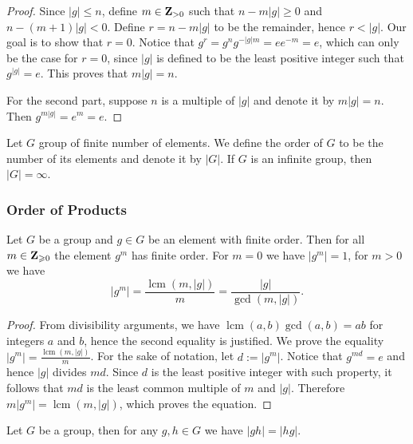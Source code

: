 \begin{proof}
  Since \(|g| \leq n\), define \(m \in \mathbf{Z}_{> 0}\) such that \(n - m |g|
  \geq 0\) and \(n - (m + 1) |g| < 0\). Define \(r = n - m |g|\) to be the
  remainder, hence \(r < |g|\). Our goal is to show that \(r = 0\). Notice that
  \(g^r = g^n g^{-|g| m} = e e^{-m} = e\), which can only be the case for \(r =
  0\), since \(|g|\) is defined to be the least positive integer such that
  \(g^{|g|} = e\). This proves that \(m |g| = n\).

  For the second part, suppose \(n\) is a multiple of \(|g|\) and denote it by
  \(m|g| = n\). Then \(g^{m |g|} = e^m = e\).
\end{proof}

\begin{definition}
  Let \(G\) group of finite number of elements. We define the order of \(G\) to
  be the number of its elements and denote it by \(|G|\). If \(G\) is an
  infinite group, then \(|G| = \infty\).
\end{definition}

\subsubsection{Order of Products}

\begin{proposition}\label{prop: order of the power}
  Let \(G\) be a group and \(g \in G\) be an element with finite order. Then for
  all \(m \in \mathbf{Z}_{\geqslant 0}\) the element \(g^m\) has finite order. For
  \(m = 0\) we have \(|g^m| = 1\), for \(m > 0\) we have
  \[
    |g^m| = \frac{\operatorname{lcm}(m, |g|)}{m} =
    \frac{|g|}{\operatorname{gcd}(m, |g|)}.
  \]
\end{proposition}

\begin{proof}
  From divisibility arguments, we have \(\operatorname{lcm}(a, b)
  \operatorname{gcd}(a, b) = ab\) for integers \(a\) and \(b\), hence the second
  equality is justified. We prove the equality \(|g^m| =
  \frac{\operatorname{lcm}(m, |g|)} m\). For the sake of notation, let \(d :=
  |g^m|\). Notice that \(g^{m d} = e\) and hence \(|g|\) divides \(m d\). Since
  \(d\) is the least positive integer with such property, it follows that \(m
  d\) is the least common multiple of \(m\) and \(|g|\). Therefore \(m |g^m| =
  \operatorname{lcm}(m, |g|)\), which proves the equation.
\end{proof}

\begin{proposition}\label{prop: order-prod-commutes}
  Let \(G\) be a group, then for any \(g, h \in G\) we have \(|gh| = |hg|\).
\end{proposition}

